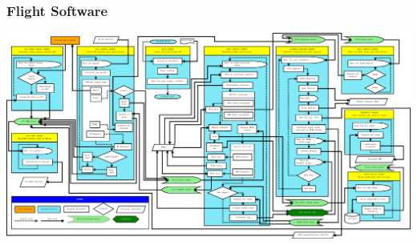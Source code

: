 \documentclass[landscape,xcolor={table}]{beamer}
\begin{document}
\begin{frame}
\begin{columns}[T]
\begin{column}{.30\textwidth}
		\end{column}%
		\end{columns}
			

	\end{frame}
	
	\begin{frame}
		
		\frametitle{Flight Software}
		
		\includegraphics[width=\textwidth]{images/mfsw_block}

	\end{frame}
	
\end{document}
